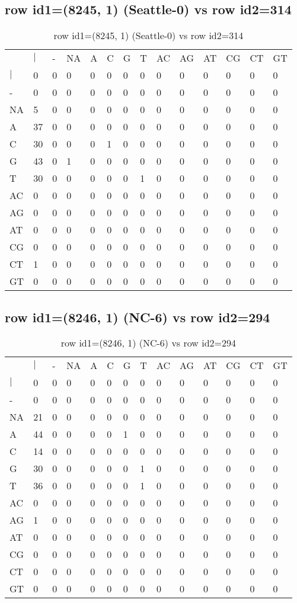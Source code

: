 \subsection{row id1=(8245, 1) (Seattle-0) vs row id2=314}
\begin{center}
\begin{longtable}{|l|l|l|l|l|l|l|l|l|l|l|l|l|l|}
\caption{row id1=(8245, 1) (Seattle-0) vs row id2=314} \label{table_dm180}\\
\hline
\\
\hline
&$|$&-&NA&A&C&G&T&AC&AG&AT&CG&CT&GT\\
$|$&0&0&0&0&0&0&0&0&0&0&0&0&0\\
-&0&0&0&0&0&0&0&0&0&0&0&0&0\\
NA&5&0&0&0&0&0&0&0&0&0&0&0&0\\
A&37&0&0&0&0&0&0&0&0&0&0&0&0\\
C&30&0&0&0&1&0&0&0&0&0&0&0&0\\
G&43&0&1&0&0&0&0&0&0&0&0&0&0\\
T&30&0&0&0&0&0&1&0&0&0&0&0&0\\
AC&0&0&0&0&0&0&0&0&0&0&0&0&0\\
AG&0&0&0&0&0&0&0&0&0&0&0&0&0\\
AT&0&0&0&0&0&0&0&0&0&0&0&0&0\\
CG&0&0&0&0&0&0&0&0&0&0&0&0&0\\
CT&1&0&0&0&0&0&0&0&0&0&0&0&0\\
GT&0&0&0&0&0&0&0&0&0&0&0&0&0\\
\hline
\end{longtable}
\end{center}

\subsection{row id1=(8246, 1) (NC-6) vs row id2=294}
\begin{center}
\begin{longtable}{|l|l|l|l|l|l|l|l|l|l|l|l|l|l|}
\caption{row id1=(8246, 1) (NC-6) vs row id2=294} \label{table_dm182}\\
\hline
\\
\hline
&$|$&-&NA&A&C&G&T&AC&AG&AT&CG&CT&GT\\
$|$&0&0&0&0&0&0&0&0&0&0&0&0&0\\
-&0&0&0&0&0&0&0&0&0&0&0&0&0\\
NA&21&0&0&0&0&0&0&0&0&0&0&0&0\\
A&44&0&0&0&0&1&0&0&0&0&0&0&0\\
C&14&0&0&0&0&0&0&0&0&0&0&0&0\\
G&30&0&0&0&0&0&1&0&0&0&0&0&0\\
T&36&0&0&0&0&0&1&0&0&0&0&0&0\\
AC&0&0&0&0&0&0&0&0&0&0&0&0&0\\
AG&1&0&0&0&0&0&0&0&0&0&0&0&0\\
AT&0&0&0&0&0&0&0&0&0&0&0&0&0\\
CG&0&0&0&0&0&0&0&0&0&0&0&0&0\\
CT&0&0&0&0&0&0&0&0&0&0&0&0&0\\
GT&0&0&0&0&0&0&0&0&0&0&0&0&0\\
\hline
\end{longtable}
\end{center}

